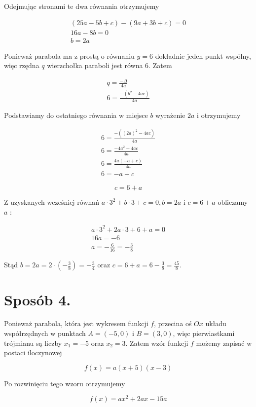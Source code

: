 \documentclass[10pt]{article}
\begin{document}
Odejmując stronami te dwa równania otrzymujemy

$$
\begin{gathered}
(25 a-5 b+c)-(9 a+3 b+c)=0 \\
16 a-8 b=0 \\
b=2 a
\end{gathered}
$$

Ponieważ parabola ma z prostą o równaniu $y=6$ dokładnie jeden punkt wspólny, więc rzędna $q$ wierzchołka paraboli jest równa 6. Zatem

$$
\begin{gathered}
q=\frac{-\Delta}{4 a} \\
6=\frac{-\left(b^{2}-4 a c\right)}{4 a}
\end{gathered}
$$

Podstawiamy do ostatniego równania w miejsce $b$ wyrażenie $2 a$ i otrzymujemy

$$
\begin{gathered}
6=\frac{-\left((2 a)^{2}-4 a c\right)}{4 a} \\
6=\frac{-4 a^{2}+4 a c}{4 a} \\
6=\frac{4 a(-a+c)}{4 a} \\
6=-a+c
\end{gathered}
$$

$$
c=6+a
$$

Z uzyskanych wcześniej równań $a \cdot 3^{2}+b \cdot 3+c=0, b=2 a$ i $c=6+a$ obliczamy $a$ :

$$
\begin{gathered}
a \cdot 3^{2}+2 a \cdot 3+6+a=0 \\
16 a=-6 \\
a=-\frac{6}{16}=-\frac{3}{8}
\end{gathered}
$$

Stąd $b=2 a=2 \cdot\left(-\frac{3}{8}\right)=-\frac{3}{4}$ oraz $c=6+a=6-\frac{3}{8}=\frac{45}{8}$.

\section*{Sposób 4.}
Ponieważ parabola, która jest wykresem funkcji $f$, przecina oś $O x$ układu współrzędnych w punktach $A=(-5,0)$ i $B=(3,0)$, więc pierwiastkami trójmianu są liczby $x_{1}=-5$ oraz $x_{2}=3$. Zatem wzór funkcji $f$ możemy zapisać w postaci iloczynowej

$$
f(x)=a(x+5)(x-3)
$$

Po rozwinięciu tego wzoru otrzymujemy

$$
f(x)=a x^{2}+2 a x-15 a
$$
\end{document}
